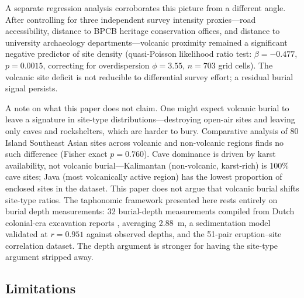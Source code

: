 \documentclass[12pt,a4paper]{article}
\begin{document}
A separate regression analysis corroborates this picture from a different angle. After controlling for three independent survey intensity proxies---road accessibility, distance to BPCB heritage conservation offices, and distance to university archaeology departments---volcanic proximity remained a significant negative predictor of site density (quasi-Poisson likelihood ratio test: $\beta = -0.477$, $p = 0.0015$, correcting for overdispersion $\phi = 3.55$, $n = 703$ grid cells). The volcanic site deficit is not reducible to differential survey effort; a residual burial signal persists.

A note on what this paper does not claim. One might expect volcanic burial to leave a signature in site-type distributions---destroying open-air sites and leaving only caves and rockshelters, which are harder to bury. Comparative analysis of 80 Island Southeast Asian sites across volcanic and non-volcanic regions finds no such difference (Fisher exact $p = 0.760$). Cave dominance is driven by karst availability, not volcanic burial---Kalimantan (non-volcanic, karst-rich) is 100\% cave sites; Java (most volcanically active region) has the lowest proportion of enclosed sites in the dataset. This paper does not argue that volcanic burial shifts site-type ratios. The taphonomic framework presented here rests entirely on burial depth measurements: 32 burial-depth measurements compiled from Dutch colonial-era excavation reports \citep{ov1925}, averaging 2.88~m, a sedimentation model validated at $r = 0.951$ against observed depths, and the 51-pair eruption--site correlation dataset. The depth argument is stronger for having the site-type argument stripped away.

\subsection{Limitations}
\end{document}
